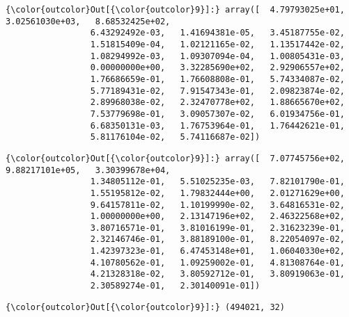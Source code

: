 \documentclass[11pt]{article}
\begin{document}
\begin{Verbatim}[commandchars=\\\{\}]
{\color{outcolor}Out[{\color{outcolor}9}]:} array([  4.79793025e+01,   3.02561030e+03,   8.68532425e+02,
                 6.43292492e-03,   1.41694381e-05,   3.45187755e-02,
                 1.51815409e-04,   1.02121165e-02,   1.13517442e-02,
                 1.08294992e-03,   1.09307094e-04,   1.00805431e-03,
                 0.00000000e+00,   3.32285690e+02,   2.92906557e+02,
                 1.76686659e-01,   1.76608808e-01,   5.74334087e-02,
                 5.77189431e-02,   7.91547343e-01,   2.09823874e-02,
                 2.89968038e-02,   2.32470778e+02,   1.88665670e+02,
                 7.53779698e-01,   3.09057307e-02,   6.01934756e-01,
                 6.68350131e-03,   1.76753964e-01,   1.76442621e-01,
                 5.81176104e-02,   5.74116687e-02])
\end{Verbatim}
            
\begin{Verbatim}[commandchars=\\\{\}]
{\color{outcolor}Out[{\color{outcolor}9}]:} array([  7.07745756e+02,   9.88217101e+05,   3.30399678e+04,
                 1.34805112e-01,   5.51025235e-03,   7.82101790e-01,
                 1.55195812e-02,   1.79832444e+00,   2.01271629e+00,
                 9.64157811e-02,   1.10199990e-02,   3.64816531e-02,
                 1.00000000e+00,   2.13147196e+02,   2.46322568e+02,
                 3.80716571e-01,   3.81016199e-01,   2.31623239e-01,
                 2.32146746e-01,   3.88189100e-01,   8.22054097e-02,
                 1.42397323e-01,   6.47453148e+01,   1.06040330e+02,
                 4.10780562e-01,   1.09259002e-01,   4.81308764e-01,
                 4.21328318e-02,   3.80592712e-01,   3.80919063e-01,
                 2.30589274e-01,   2.30140091e-01])
\end{Verbatim}
            
\begin{Verbatim}[commandchars=\\\{\}]
{\color{outcolor}Out[{\color{outcolor}9}]:} (494021, 32)
\end{Verbatim}
            
\end{document}
